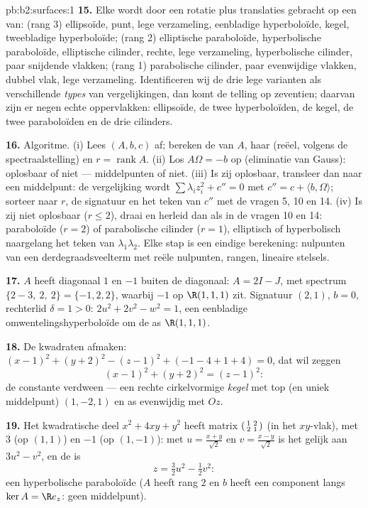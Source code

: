 \begin{solution}{pb:b2:surfaces:1}
\textbf{15.} Elke  wordt door een rotatie plus translaties
gebracht op een van: (rang 3) ellipsoïde, punt, lege verzameling,
eenbladige hyperboloïde, kegel, tweebladige hyperboloïde; (rang 2)
elliptische paraboloïde, hyperbolische paraboloïde, elliptische
cilinder, rechte, lege verzameling, hyperbolische cilinder, paar
snijdende vlakken; (rang 1) parabolische cilinder, paar
evenwijdige vlakken, dubbel vlak, lege verzameling. Identificeren
wij de drie lege varianten als verschillende \emph{ types}
van vergelijkingen, dan komt de telling op zeventien; daarvan zijn
er negen echte oppervlakken: ellipsoïde, de twee hyperboloïden, de
kegel, de twee paraboloïden en de drie cilinders.

\textbf{16.} Algoritme. (i) Lees $(A, b, c)$ af; bereken de
 van $A$, haar  (reëel, volgens
de spectraalstelling) en $r = \operatorname{rank}A$. (ii) Los
$A\Omega = -b$ op (eliminatie van Gauss): oplosbaar of niet ---
middelpunten of niet. (iii) Is zij oplosbaar, transleer dan naar
een middelpunt: de vergelijking wordt $\sum\lambda_iz_i^2 + c'' =
0$ met $c'' = c + \langle b, \Omega\rangle$; sorteer naar $r$, de
signatuur en het teken van $c''$ met de vragen 5, 10 en 14. (iv) Is
zij niet oplosbaar ($r \leq 2$), draai en herleid dan als in de
vragen 10 en 14: paraboloïde ($r = 2$) of parabolische cilinder ($r
= 1$), elliptisch of hyperbolisch naargelang het teken van
$\lambda_1\lambda_2$. Elke stap is een eindige berekening:
nulpunten van een derdegraadsveelterm met reële nulpunten, rangen,
lineaire stelsels.

\textbf{17.} $A$ heeft diagonaal $1$ en $-1$ buiten de diagonaal:
$A = 2I - J$, met spectrum $\{2 - 3,\ 2,\ 2\} = \{-1, 2, 2\}$,
waarbij $-1$ op $\R(1,1,1)$ zit. Signatuur $(2,1)$, $b = 0$,
rechterlid $\delta = 1 > 0$: $2u^2 + 2v^2 - w^2 = 1$, een
eenbladige omwentelingshyperboloïde om de as $\R(1,1,1)$.

\textbf{18.} De kwadraten afmaken: $(x-1)^2 + (y+2)^2 - (z-1)^2 +
(-1 - 4 + 1 + 4) = 0$, dat wil zeggen
\[
(x-1)^2 + (y+2)^2 = (z-1)^2 :
\]
de constante verdween --- een rechte cirkelvormige \emph{kegel} met
top (en uniek middelpunt) $(1, -2, 1)$ en as evenwijdig met $Oz$.

\textbf{19.} Het kwadratische deel $x^2 + 4xy + y^2$ heeft matrix
$\begin{psmallmatrix}1 & 2\\ 2 & 1\end{psmallmatrix}$ (in het
$xy$-vlak), met  $3$ (op $(1,1)$) en $-1$ (op
$(1,-1)$): met $u = \frac{x+y}{\sqrt2}$ en $v =
\frac{x-y}{\sqrt2}$ is het gelijk aan $3u^2 - v^2$, en de 
is
\[
z = \tfrac32u^2 - \tfrac12v^2 :
\]
een hyperbolische paraboloïde ($A$ heeft rang $2$ en $b$ heeft een
component langs $\ker A = \R e_z$: geen middelpunt).


\end{solution}
